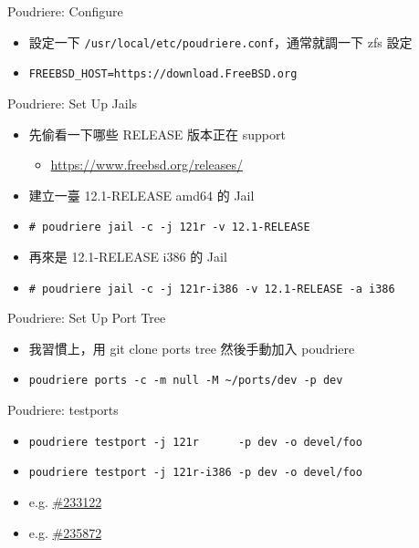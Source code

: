 \documentclass[aspectratio=169]{beamer}
\begin{document}
\begin{frame}[t,fragile]{Poudriere: Configure}
  \begin{itemize}
    \item 設定一下 \verb`/usr/local/etc/poudriere.conf`，通常就調一下 zfs 設定
    \item \verb`FREEBSD_HOST=https://download.FreeBSD.org`
  \end{itemize}
\end{frame}

\begin{frame}[t,fragile]{Poudriere: Set Up Jails}
  \begin{itemize}
    \item<1-> 先偷看一下哪些 RELEASE 版本正在 support
      \begin{itemize}
        \item \href{https://www.freebsd.org/releases/}{https://www.freebsd.org/releases/}
      \end{itemize}

    \item<2-> 建立一臺 12.1-RELEASE amd64 的 Jail
    \item<2-> \verb`# poudriere jail -c -j 121r -v 12.1-RELEASE`
    \item<3-> 再來是 12.1-RELEASE i386 的 Jail
    \item<3-> \verb`# poudriere jail -c -j 121r-i386 -v 12.1-RELEASE -a i386`
  \end{itemize}
\end{frame}

\begin{frame}[t,fragile]{Poudriere: Set Up Port Tree}
  \begin{itemize}
    \item 我習慣上，用 git clone ports tree 然後手動加入 poudriere
    \item \verb`poudriere ports -c -m null -M ~/ports/dev -p dev`
  \end{itemize}
\end{frame}

\begin{frame}[t,fragile]{Poudriere: testports}
  \begin{itemize}
    \item \verb`poudriere testport -j 121r      -p dev -o devel/foo`
    \item \verb`poudriere testport -j 121r-i386 -p dev -o devel/foo`
    \item e.g. \href{https://bugs.freebsd.org/bugzilla/show_bug.cgi?id=233122}{\#233122}
    \item e.g. \href{https://bugs.freebsd.org/bugzilla/show_bug.cgi?id=235872}{\#235872}
  \end{itemize}
\end{frame}
\end{document}
